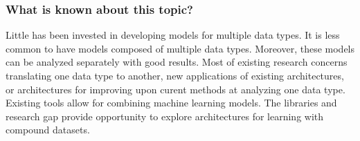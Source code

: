 \subsubsection{What is known about this topic?}

Little has been invested in developing models for multiple data types.  It is less common to have models composed of multiple data types.  Moreover, these models can be analyzed separately with good results.  Most of existing research concerns translating one data type to another, new applications of existing architectures, or architectures for improving upon curent methods at analyzing one data type. Existing tools allow for combining machine learning models. The libraries and research gap provide opportunity to explore architectures for learning with compound datasets.  
